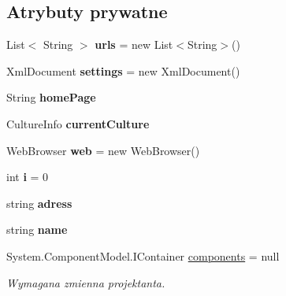 \subsection*{Atrybuty prywatne}
\begin{DoxyCompactItemize}
\item 
\mbox{\label{class_windows_forms_app2_1_1_przegladarka_a4e6b33e38a6f98f8b3202ee9d5388060}} 
List$<$ String $>$ {\bfseries urls} = new List$<$String$>$()
\item 
\mbox{\label{class_windows_forms_app2_1_1_przegladarka_a6d8a0bbfaf93459ed58e74f1574613a8}} 
Xml\+Document {\bfseries settings} = new Xml\+Document()
\item 
\mbox{\label{class_windows_forms_app2_1_1_przegladarka_a27d7a3016562096e7921af6ce7aada19}} 
String {\bfseries home\+Page}
\item 
\mbox{\label{class_windows_forms_app2_1_1_przegladarka_ad655150adfd804d9faebd51a6da14e9d}} 
Culture\+Info {\bfseries current\+Culture}
\item 
\mbox{\label{class_windows_forms_app2_1_1_przegladarka_a667aaf337588647c9aa1b83e4276342c}} 
Web\+Browser {\bfseries web} = new Web\+Browser()
\item 
\mbox{\label{class_windows_forms_app2_1_1_przegladarka_a8966d3dd2130d3703ab0996b207fd962}} 
int {\bfseries i} = 0
\item 
\mbox{\label{class_windows_forms_app2_1_1_przegladarka_ab7e4a0fbc445af3c0efd986ce799814e}} 
string {\bfseries adress}
\item 
\mbox{\label{class_windows_forms_app2_1_1_przegladarka_ab013f26b227dcbe75ffe19787a524122}} 
string {\bfseries name}
\item 
System.\+Component\+Model.\+I\+Container \hyperlink{class_windows_forms_app2_1_1_przegladarka_a37fd573e6d383f202dbea9da1940a947}{components} = null
\begin{DoxyCompactList}\small\item\em Wymagana zmienna projektanta. \end{DoxyCompactList}\item 

\end{DoxyCompactItemize}

